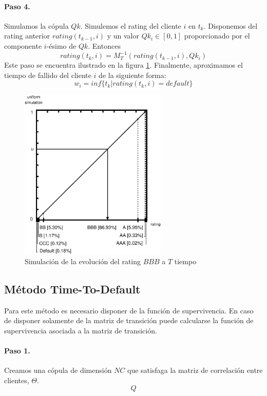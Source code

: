 \paragraph{Paso 4.} Simulamos la c\'opula $Qk$. Simulemos el rating del cliente
$i$ en $t_k$. Disponemos del rating anterior $rating(t_{k-1},i)$ y un valor
$Qk_i \in [0,1]$ proporcionado por el componente $i$-\'esimo de $Qk$. Entonces
\begin{displaymath}
rating(t_k,i) = M_T^{-1}(rating(t_{k-1},i),Qk_i)
\end{displaymath}
Este paso se encuentra ilustrado en la figura \ref{simrp}. Finalmente, aproximamos
el tiempo de fallido del cliente $i$ de la siguiente forma:
\begin{displaymath}
w_i = inf\{t_k | rating(t_k,i) = default\}
\end{displaymath}

\begin{figure}[!hb]
\begin{center}
\includegraphics[width=7cm,angle=0]{./images/simrp.eps}
\caption{Simulaci\'on de la evoluci\'on del rating $BBB$ a $T$ tiempo}
\label{simrp}
\end{center}
\end{figure}

\subsection{M\'etodo Time-To-Default}

Para este m\'etodo es necesario disponer de la funci\'on de supervivencia. En caso
de disponer solamente de la matriz de transici\'on puede calcularse la funci\'on
de supervivencia asociada a la matriz de transici\'on.

\paragraph{Paso 1.} Creamos una c\'opula de dimensi\'on $NC$ que satisfaga la
matriz de correlaci\'on entre clientes, $\Theta$.
\begin{displaymath}
Q
\end{displaymath}

